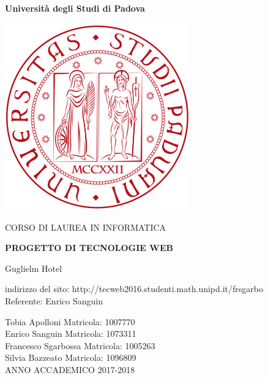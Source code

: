 \begin{titlepage}%

	\begin{center}
	\begin{huge}
		\textbf{Università degli Studi di Padova}
	\end{huge}
	\vspace{2cm}
	\begin{center}
		\includegraphics[width=8cm]{../templates/_Immagini/logo.png}
	\end{center}
	\vspace{1cm}
	
	\begin{LARGE}CORSO DI LAUREA IN INFORMATICA \end{LARGE}

	\vspace{1cm}
	
	\begin{huge}
		\textbf{PROGETTO DI TECNOLOGIE WEB}
	\end{huge}

	\vspace{2cm}

	\begin{LARGE}Guglielm Hotel \end{LARGE}

	\vspace{2cm}

	indirizzo del sito: http://tecweb2016.studenti.math.unipd.it/frsgarbo\\
	Referente: Enrico Sanguin
	\vspace{1cm}

	Tobia Apolloni Matricola: 1007770	\\
	Enrico Sanguin Matricola: 1073311	\\
	Francesco Sgarbossa Matricola: 1005263	\\
	Silvia Bazzeato Matricola: 1096809	\\
	\vspace{1cm}
	ANNO ACCADEMICO 2017-2018
	\end{center}
\end{titlepage}%

\clearpage
